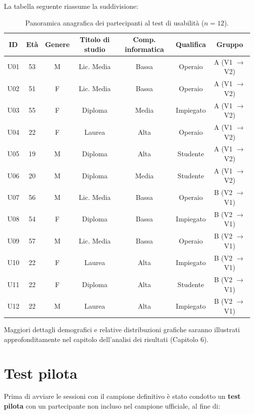 La tabella seguente riassume la suddivisione:

\begin{table}[H]
\centering
\renewcommand{\arraystretch}{1.4}
\small
\begin{tabular}{|c|c|c|c|c|c|c|}
\hline
\textbf{ID} & \textbf{Età} & \textbf{Genere} & \textbf{Titolo di studio} & \textbf{Comp. informatica} & \textbf{Qualifica} & \textbf{Gruppo} \\
\hline
U01 & 53 & M & Lic. Media   & Bassa  & Operaio    & A (V1 $\to$ V2) \\ \hline
U02 & 51 & F & Lic. Media   & Bassa  & Operaio    & A (V1 $\to$ V2) \\ \hline
U03 & 55 & F & Diploma      & Media  & Impiegato  & A (V1 $\to$ V2) \\ \hline
U04 & 22 & F & Laurea       & Alta   & Operaio    & A (V1 $\to$ V2) \\ \hline
U05 & 19 & M & Diploma      & Alta   & Studente   & A (V1 $\to$ V2) \\ \hline
U06 & 20 & M & Diploma      & Media  & Studente   & A (V1 $\to$ V2) \\ \hline
U07 & 56 & M & Lic. Media   & Bassa  & Operaio    & B (V2 $\to$ V1) \\ \hline
U08 & 54 & F & Diploma      & Bassa  & Impiegato  & B (V2 $\to$ V1) \\ \hline
U09 & 57 & M & Lic. Media   & Bassa  & Operaio    & B (V2 $\to$ V1) \\ \hline
U10 & 22 & F & Laurea       & Alta   & Impiegato  & B (V2 $\to$ V1) \\ \hline
U11 & 22 & F & Diploma      & Alta   & Studente   & B (V2 $\to$ V1) \\ \hline
U12 & 22 & M & Laurea       & Alta   & Impiegato  & B (V2 $\to$ V1) \\ \hline
\end{tabular}
\caption{Panoramica anagrafica dei partecipanti al test di usabilità ($n=12$).}
\label{tab:partecipanti}
\end{table}

Maggiori dettagli demografici e relative distribuzioni grafiche saranno illustrati approfonditamente nel capitolo dell'analisi dei risultati (Capitolo 6).

\section{Test pilota}

Prima di avviare le sessioni con il campione definitivo è stato condotto un \textbf{test pilota} con un partecipante non incluso nel campione ufficiale, al fine di:

